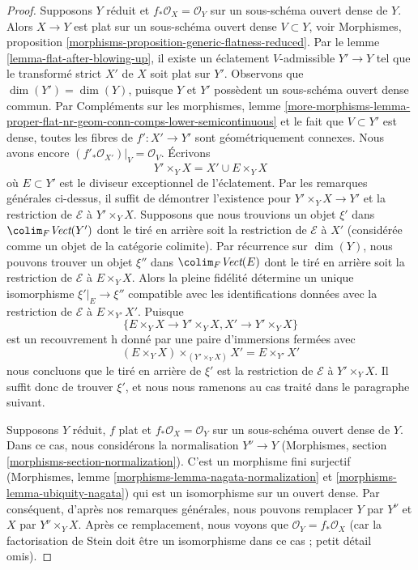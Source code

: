 \begin{proof}
\medskip\noindent
Supposons $Y$ réduit et $f_*\mathcal{O}_X = \mathcal{O}_Y$
sur un sous-schéma ouvert dense de $Y$.
Alors $X \to Y$ est plat sur un sous-schéma
ouvert dense $V \subset Y$, voir
Morphismes, proposition \ref{morphisms-proposition-generic-flatness-reduced}.
Par le lemme \ref{lemma-flat-after-blowing-up},
il existe un éclatement $V$-admissible $Y' \to Y$ tel que
le transformé strict $X'$ de $X$ soit plat sur $Y'$.
Observons que $\dim(Y') = \dim(Y)$, puisque $Y$ et $Y'$ possèdent
un sous-schéma ouvert dense commun. Par Compléments sur les morphismes, lemme
\ref{more-morphisms-lemma-proper-flat-nr-geom-conn-comps-lower-semicontinuous}
et le fait que $V \subset Y'$ est dense,
toutes les fibres de $f' : X' \to Y'$ sont géométriquement connexes.
Nous avons encore $(f'_*\mathcal{O}_{X'})|_V = \mathcal{O}_V$.
Écrivons
$$
Y' \times_Y X = X' \cup E \times_Y X
$$
où $E \subset Y'$ est le diviseur exceptionnel de l'éclatement.
Par les remarques générales ci-dessus, il suffit de démontrer l'existence
pour $Y' \times_Y X \to Y'$ et la restriction de $\mathcal{E}$
à $Y' \times_Y X$.
Supposons que nous trouvions un objet $\xi'$ dans $\colim_F \textit{Vect}(Y')$
dont le tiré en arrière soit la restriction de $\mathcal{E}$ à $X'$ (considérée
comme un objet de la catégorie colimite).
Par récurrence sur $\dim(Y)$, nous pouvons trouver un objet $\xi''$ dans
$\colim_F \textit{Vect}(E)$ dont le tiré en arrière soit la restriction de
$\mathcal{E}$ à $E \times_Y X$. Alors la pleine fidélité
détermine un unique isomorphisme $\xi'|_E \to \xi''$
compatible avec les identifications données avec la restriction
de $\mathcal{E}$ à $E \times_{Y'} X'$. Puisque
$$
\{E \times_Y X \to Y' \times_Y X, X' \to Y' \times_Y X\}
$$
est un recouvrement h donné par une paire d'immersions fermées avec
$$
(E \times_Y X) \times_{(Y' \times_Y X)} X' = E \times_{Y'} X'
$$
nous concluons que le tiré en arrière de $\xi'$ est la restriction de
$\mathcal{E}$ à $Y' \times_Y X$. Il suffit donc de trouver
$\xi'$, et nous nous ramenons au cas traité dans le paragraphe suivant.

\medskip\noindent
Supposons $Y$ réduit, $f$ plat et $f_*\mathcal{O}_X = \mathcal{O}_Y$
sur un sous-schéma ouvert dense de $Y$. Dans ce cas, nous considérons la
normalisation $Y^\nu \to Y$ (Morphismes, section
\ref{morphisms-section-normalization}). C'est un
morphisme fini surjectif
(Morphismes, lemme \ref{morphisms-lemma-nagata-normalization} et
\ref{morphisms-lemma-ubiquity-nagata}) qui est un isomorphisme
sur un ouvert dense. Par conséquent, d'après nos remarques générales, nous pouvons
remplacer $Y$ par $Y^\nu$ et $X$ par $Y^\nu \times_Y X$.
Après ce remplacement, nous voyons que $\mathcal{O}_Y = f_*\mathcal{O}_X$
(car la factorisation de Stein doit être un isomorphisme
dans ce cas ; petit détail omis).


\end{proof}

